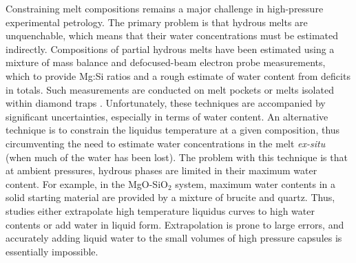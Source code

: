 \documentclass[review]{elsarticle}
\begin{document}


Constraining melt compositions remains a major challenge in high-pressure experimental petrology. The primary problem is that hydrous melts are unquenchable, which means that their water concentrations must be estimated indirectly. Compositions of partial hydrous melts have been estimated using a mixture of mass balance and defocused-beam electron probe measurements, which to provide Mg:Si ratios and a rough estimate of water content from deficits in totals. Such measurements are conducted on melt pockets \citep[e.g.][]{OMY2000, DDFK2005, LSOK2011} or melts isolated within diamond traps \citep{MSUP2007}. Unfortunately, these techniques are accompanied by significant uncertainties, especially in terms of water content. An alternative technique is to constrain the liquidus temperature at a given composition, thus circumventing the need to estimate water concentrations in the melt \emph{ex-situ} (when much of the water has been lost). The problem with this technique is that at ambient pressures, hydrous phases are limited in their maximum water content. For example, in the MgO-SiO$_2$ system, maximum water contents in a solid starting material are provided by a mixture of brucite and quartz. Thus, studies either extrapolate high temperature liquidus curves to high water contents or add water in liquid form. Extrapolation is prone to large errors, and accurately adding liquid water to the small volumes of high pressure capsules is essentially impossible. 
\end{document}
